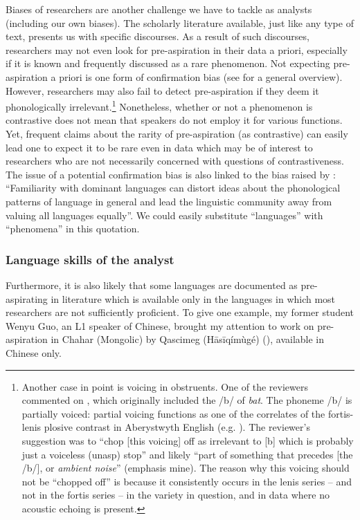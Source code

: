 \documentclass[output=paper]{langscibook}
\begin{document}
Biases of researchers are another challenge we have to tackle as analysts (including our own biases). The scholarly literature available, just like any type of text, presents us with specific discourses. As a result of such discourses, researchers may not even look for pre\hyp aspiration in their data a priori, especially if it is known and frequently discussed as a rare phenomenon. Not expecting pre\hyp aspiration a priori is one form of confirmation bias (see \citealt{Klayman1995} for a general overview). However, researchers may also fail to detect pre\hyp aspiration if they deem it phonologically irrelevant.\footnote{Another case in point is voicing in obstruents. One of the reviewers commented on , which originally included the /b/ of \textit{bat}. The phoneme /b/ is partially voiced: partial voicing functions as one of the correlates of the fortis-lenis plosive contrast in Aberystwyth English (e.g. \citealt{Hejná2016b}). The reviewer’s suggestion was to “chop [this voicing] off as irrelevant to [b] which is probably just a voiceless (unasp) stop” and likely “part of something that precedes [the /b/], or \emph{ambient noise}” (emphasis mine). The reason why this voicing should not be “chopped off” is because it consistently occurs in the lenis series – and not in the fortis series – in the variety in question, and in data where no acoustic echoing is present.} Nonetheless, whether or not a phenomenon is contrastive does not mean that speakers do not employ it for various functions. Yet, frequent claims about the rarity of pre\hyp aspiration (as contrastive) can easily lead one to expect it to be rare even in data which may be of interest to researchers who are not necessarily concerned with questions of contrastiveness. The issue of a potential confirmation bias is also linked to the bias raised by \citet{Maddieson2021}: “Familiarity with dominant languages can distort ideas about the phonological patterns of language in general and lead the linguistic community away from valuing all languages equally”. We could easily substitute “languages” with “phenomena” in this quotation.

\subsubsection{Language skills of the analyst}

Furthermore, it is also likely that some languages are documented as pre-as\-pi\-ra\-ting in literature which is available only in the languages in which most researchers are not sufficiently proficient. To give one example, my former student Wenyu Guo, an L1 speaker of Chinese, brought my attention to work on pre\hyp aspiration in Chahar (Mongolic) by Qascimeg (Hāsīqímùgé) (\citeyear{Qascimeg2008}), available in Chinese only.
\end{document}
